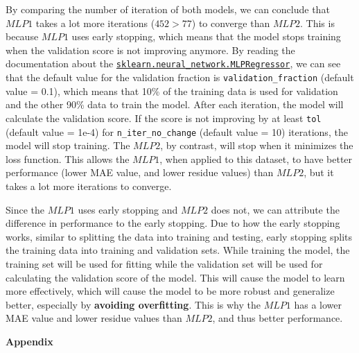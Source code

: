 \documentclass[12pt]{article}
\begin{document}
\begin{enumerate}[leftmargin=\labelsep,resume]
          By comparing the number of iteration of both models, we can conclude that
          $MLP1$ takes a lot more iterations ($452 > 77$) to converge than $MLP2$.
          This is because $MLP1$ uses early stopping, which means that the model
          stops training when the validation score is not improving anymore.
          By reading the documentation about the
          \href{https://scikit-learn.org/stable/modules/generated/sklearn.neural_network.MLPRegressor.html}{\texttt{sklearn.neural\_network.MLPRegressor}},
          we can see that the default value for the validation fraction is
          \texttt{validation\_fraction} (default value = 0.1), which means that 10\%
          of the training data is used for validation and the other 90\% data
          to train the model.
          After each iteration, the model will calculate the validation score.
          If the score is not improving by at least \texttt{tol} (default value = 1e-4)
          for \texttt{n\_iter\_no\_change} (default value = 10) iterations,
          the model will stop training.
          The $MLP2$, by contrast, will stop when it minimizes the loss function.
          This allows the $MLP1$, when applied to this dataset, to have better performance
          (lower MAE value, and lower residue values) than $MLP2$, but it takes a
          lot more iterations to converge.

          Since the $MLP1$ uses early stopping and $MLP2$ does not, we can
          attribute the difference in performance to the early stopping.
          Due to how the early stopping works, similar to splitting the data
          into training and testing, early stopping splits the training data
          into training and validation sets.
          While training the model, the training set will be used for fitting
          while the validation set will be used for calculating the validation
          score of the model.
          This will cause the model to learn more effectively, which will cause
          the model to be more robust and generalize better, especially by
          \textbf{avoiding overfitting}.
          This is why the $MLP1$ has a lower MAE value and lower residue values than $MLP2$,
          and thus better performance.

\end{enumerate}

\pagebreak

\center\large{\textbf{Appendix}\vskip 0.3cm}



\vspace*{1.5cm}



\vspace*{1.5cm}


\end{document}
